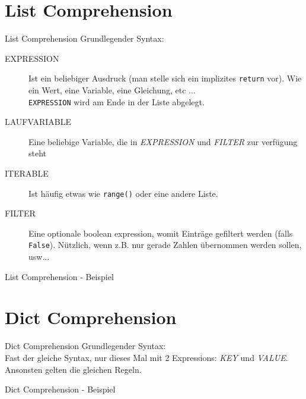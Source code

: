 \section{List Comprehension}
\begin{frame}{List Comprehension}
  Grundlegender Syntax: \\
  \begin{description}
    \item[EXPRESSION] Ist ein beliebiger Ausdruck (man stelle sich ein implizites \texttt{return} vor). Wie ein Wert, eine Variable, eine Gleichung, etc ... \\
    	\texttt{EXPRESSION} wird am Ende in der Liste abgelegt.
    \item[LAUFVARIABLE] Eine beliebige Variable, die in \textit{EXPRESSION} und \textit{FILTER} zur verfügung steht
    \item[ITERABLE] Ist häufig etwas wie \texttt{range()} oder eine andere Liste.
    \item[FILTER] Eine optionale boolean expression, womit Einträge gefiltert werden (falls \texttt{False}). N\"utzlich, wenn z.B. nur gerade Zahlen \"ubernommen werden sollen, usw...
  \end{description}

\end{frame}

\begin{frame}{List Comprehension - Beispiel}
	
\end{frame}



\section{Dict Comprehension}
\begin{frame}{Dict Comprehension}
  Grundlegender Syntax: \\[.75cm]
  Fast der gleiche Syntax, nur dieses Mal mit 2 Expressions: \textit{KEY} und \textit{VALUE}. Ansonsten gelten die gleichen Regeln.
\end{frame}

\begin{frame}{Dict Comprehension - Beispiel}
	
\end{frame}



